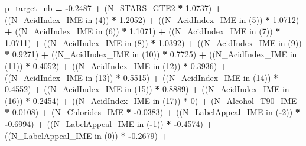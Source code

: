 \documentclass[]{article}
\newenvironment{Shaded}{\begin{snugshade}}{\end{snugshade}}
\newcommand{\KeywordTok}[1]{\textcolor[rgb]{0.13,0.29,0.53}{\textbf{{#1}}}}
\newcommand{\DecValTok}[1]{\textcolor[rgb]{0.00,0.00,0.81}{{#1}}}
\newcommand{\FloatTok}[1]{\textcolor[rgb]{0.00,0.00,0.81}{{#1}}}
\newcommand{\NormalTok}[1]{{#1}}
\begin{document}
\begin{Shaded}
\begin{Highlighting}[]
{{{{{{{{{{{{{{{{{{{{{{{{{{{{{{{{{{{{{{{{{{{{{{{{{    
    \NormalTok{p_target_nb }\KeywordTok{=} \KeywordTok{-}\FloatTok{0.2487} \KeywordTok{+}
    \NormalTok{(N_STARS_GTE2   }\KeywordTok{*}   \FloatTok{1.0737}\NormalTok{)   }\KeywordTok{+}
    \NormalTok{((N_AcidIndex_IME  in (}\DecValTok{4}\NormalTok{)) }\KeywordTok{*}   \FloatTok{1.2052}\NormalTok{)   }\KeywordTok{+}
    \NormalTok{((N_AcidIndex_IME  in (}\DecValTok{5}\NormalTok{)) }\KeywordTok{*}   \FloatTok{1.0712}\NormalTok{)   }\KeywordTok{+}
    \NormalTok{((N_AcidIndex_IME  in (}\DecValTok{6}\NormalTok{)) }\KeywordTok{*}   \FloatTok{1.1071}\NormalTok{)   }\KeywordTok{+}
    \NormalTok{((N_AcidIndex_IME  in (}\DecValTok{7}\NormalTok{)) }\KeywordTok{*}   \FloatTok{1.0711}\NormalTok{)   }\KeywordTok{+}
    \NormalTok{((N_AcidIndex_IME  in (}\DecValTok{8}\NormalTok{)) }\KeywordTok{*}   \FloatTok{1.0392}\NormalTok{)   }\KeywordTok{+}
    \NormalTok{((N_AcidIndex_IME  in (}\DecValTok{9}\NormalTok{)) }\KeywordTok{*}   \FloatTok{0.9271}\NormalTok{)   }\KeywordTok{+}
    \NormalTok{((N_AcidIndex_IME  in (}\DecValTok{10}\NormalTok{)) }\KeywordTok{*}   \FloatTok{0.7725}\NormalTok{)   }\KeywordTok{+}
    \NormalTok{((N_AcidIndex_IME  in (}\DecValTok{11}\NormalTok{)) }\KeywordTok{*}   \FloatTok{0.4052}\NormalTok{)   }\KeywordTok{+}
    \NormalTok{((N_AcidIndex_IME  in (}\DecValTok{12}\NormalTok{)) }\KeywordTok{*}   \FloatTok{0.3936}\NormalTok{)   }\KeywordTok{+}
    \NormalTok{((N_AcidIndex_IME  in (}\DecValTok{13}\NormalTok{)) }\KeywordTok{*}   \FloatTok{0.5515}\NormalTok{)   }\KeywordTok{+}
    \NormalTok{((N_AcidIndex_IME  in (}\DecValTok{14}\NormalTok{)) }\KeywordTok{*}   \FloatTok{0.4552}\NormalTok{)   }\KeywordTok{+}
    \NormalTok{((N_AcidIndex_IME  in (}\DecValTok{15}\NormalTok{)) }\KeywordTok{*}   \FloatTok{0.8889}\NormalTok{)   }\KeywordTok{+}
    \NormalTok{((N_AcidIndex_IME  in (}\DecValTok{16}\NormalTok{)) }\KeywordTok{*}   \FloatTok{0.2454}\NormalTok{)   }\KeywordTok{+}
    \NormalTok{((N_AcidIndex_IME  in (}\DecValTok{17}\NormalTok{)) }\KeywordTok{*}   \DecValTok{0}\NormalTok{)   }\KeywordTok{+}
    \NormalTok{(N_Alcohol_T90_IME   }\KeywordTok{*}   \FloatTok{0.0108}\NormalTok{)   }\KeywordTok{+}
    \NormalTok{(N_Chlorides_IME   }\KeywordTok{*}   \KeywordTok{-}\FloatTok{0.0383}\NormalTok{)   }\KeywordTok{+}
    \NormalTok{((N_LabelAppeal_IME  in (}\KeywordTok{-}\DecValTok{2}\NormalTok{)) }\KeywordTok{*}   \KeywordTok{-}\FloatTok{0.6994}\NormalTok{)   }\KeywordTok{+}
    \NormalTok{((N_LabelAppeal_IME  in (}\KeywordTok{-}\DecValTok{1}\NormalTok{)) }\KeywordTok{*}   \KeywordTok{-}\FloatTok{0.4574}\NormalTok{)   }\KeywordTok{+}
    \NormalTok{((N_LabelAppeal_IME  in (}\DecValTok{0}\NormalTok{)) }\KeywordTok{*}   \KeywordTok{-}\FloatTok{0.2679}\NormalTok{)   }\KeywordTok{+}
}}}}}}}}}}}}}}}}}}}}}}}}}}}}}}}}}}}}}}}}}}}}}}}}}
\end{Highlighting}
\end{Shaded}
\end{document}
